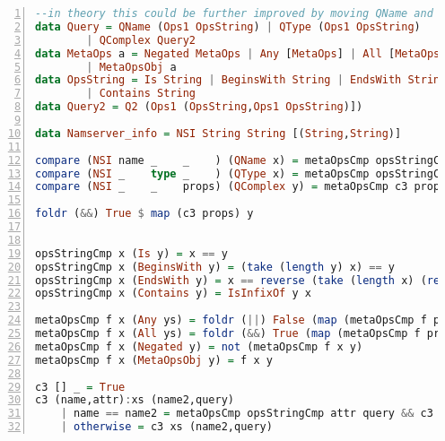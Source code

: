 \begin{lstlisting}[caption={Originally intended Query System (haskell pseudocode)}, 
label=lst:rpc_calls_1, numbers=left, stepnumber=1, float, floatplacement=tl, 
frame=tb, language=haskell]
--in theory this could be further improved by moving QName and QType in as pseudo props or actual props as described in the text
data Query = QName (Ops1 OpsString) | QType (Ops1 OpsString) 
		| QComplex Query2
data MetaOps a = Negated MetaOps | Any [MetaOps] | All [MetaOps] 
		| MetaOpsObj a
data OpsString = Is String | BeginsWith String | EndsWith String 
		| Contains String
data Query2 = Q2 (Ops1 (OpsString,Ops1 OpsString)])

data Namserver_info = NSI String String [(String,String)]

compare (NSI name _    _    ) (QName x) = metaOpsCmp opsStringCmp name x
compare (NSI _    type _    ) (QType x) = metaOpsCmp opsStringCmp type x
compare (NSI _    _    props) (QComplex y) = metaOpsCmp c3 props y

foldr (&&) True $ map (c3 props) y


opsStringCmp x (Is y) = x == y
opsStringCmp x (BeginsWith y) = (take (length y) x) == y
opsStringCmp x (EndsWith y) = x == reverse (take (length x) (reverse y))
opsStringCmp x (Contains y) = IsInfixOf y x

metaOpsCmp f x (Any ys) = foldr (||) False (map (metaOpsCmp f props) ys)
metaOpsCmp f x (All ys) = foldr (&&) True (map (metaOpsCmp f props) ys)
metaOpsCmp f x (Negated y) = not (metaOpsCmp f x y)
metaOpsCmp f x (MetaOpsObj y) = f x y

c3 [] _ = True
c3 (name,attr):xs (name2,query)
	| name == name2 = metaOpsCmp opsStringCmp attr query && c3 xs (name2,query)
	| otherwise = c3 xs (name2,query)

\end{lstlisting}
